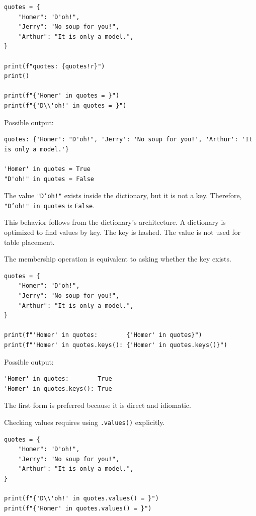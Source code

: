 \begin{verbatim}
quotes = {
    "Homer": "D'oh!",
    "Jerry": "No soup for you!",
    "Arthur": "It is only a model.",
}

print(f"quotes: {quotes!r}")
print()

print(f"{'Homer' in quotes = }")
print(f"{'D\\'oh!' in quotes = }")
\end{verbatim}

Possible output:

\begin{verbatim}
quotes: {'Homer': "D'oh!", 'Jerry': 'No soup for you!', 'Arthur': 'It is only a model.'}

'Homer' in quotes = True
"D'oh!" in quotes = False
\end{verbatim}

The value \texttt{"D'oh!"} exists inside the dictionary, but it is not a key. Therefore, \texttt{"D'oh!" in quotes} is \texttt{False}.

This behavior follows from the dictionary's architecture. A dictionary is optimized to find values by key. The key is hashed. The value is not used for table placement.

The membership operation is equivalent to asking whether the key exists.

\begin{verbatim}
quotes = {
    "Homer": "D'oh!",
    "Jerry": "No soup for you!",
    "Arthur": "It is only a model.",
}

print(f"'Homer' in quotes:        {'Homer' in quotes}")
print(f"'Homer' in quotes.keys(): {'Homer' in quotes.keys()}")
\end{verbatim}

Possible output:

\begin{verbatim}
'Homer' in quotes:        True
'Homer' in quotes.keys(): True
\end{verbatim}

The first form is preferred because it is direct and idiomatic.

Checking values requires using \texttt{.values()} explicitly.

\begin{verbatim}
quotes = {
    "Homer": "D'oh!",
    "Jerry": "No soup for you!",
    "Arthur": "It is only a model.",
}

print(f"{'D\\'oh!' in quotes.values() = }")
print(f"{'Homer' in quotes.values() = }")
\end{verbatim}

